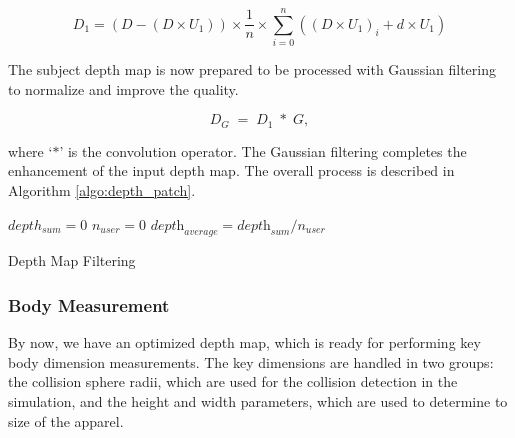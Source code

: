 \documentclass[number,preprint,review,12pt]{elsarticle}
\begin{document}
\begin{equation}
D_1=(D-(D \times U_1 )) \times \frac{1}{n} \times \sum\limits_{i=0}^n \left(\left(D \times U_1 \right)_i + d \times U_1 \right)
\label{eqn:patch_depth}
\end{equation}

The subject depth map is now prepared to be processed with Gaussian filtering to normalize and improve the quality. 

\begin{equation}
D_G\;=\;D_1\;*\;G, 
\label{eqn:gaussian_convolution}
\end{equation}

\noindent where `$*$' is the convolution operator. The Gaussian filtering completes the enhancement of the input depth map. 
The overall process is described in Algorithm \ref{algo:depth_patch}.

\singlespacing

\begin{algorithm}
\DontPrintSemicolon 
{}
$depth_{sum}=0$ \;
$n_{user} =0$\;
$\textit{depth}_\textit{average}=\textit{depth}_\textit{sum}/n_\textit{user}$ \;
 
\caption{Depth Map Filtering}
\label{algo:depth_patch}
\end{algorithm}

\doublespacing

\subsubsection{Body Measurement}
\label{subsubsec:4.2} 

By now, we have an optimized depth map, which is ready for performing key body dimension measurements. The key dimensions are handled in two groups:
 the collision sphere radii, which are used for the collision detection in the simulation, and the height and width parameters, which are used to determine to size of the apparel. 
\end{document}
